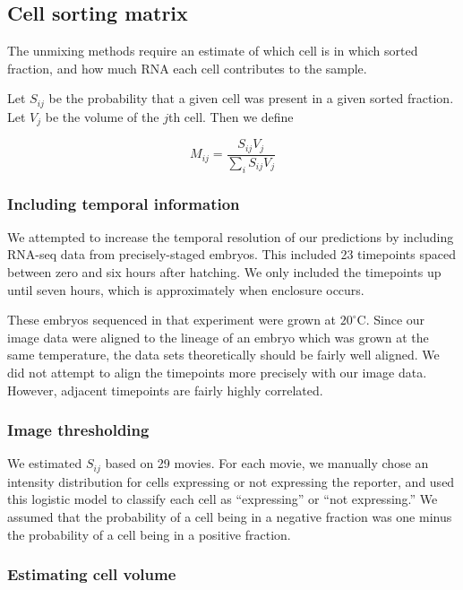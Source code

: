 \documentclass{article}
\begin{document}
\subsection*{Cell sorting matrix}

The unmixing methods require an estimate of which cell is in which sorted fraction,
and how much RNA each cell contributes to the sample.

Let $S_{ij}$ be
the probability that a given cell was present in a given sorted fraction. Let $V_j$
be the volume of the $j$th cell. Then we define

\[
M_{ij} = \frac{S_{ij} V_j}{ \sum\limits_{i}^{} S_{ij} V_j }
\]

\subsubsection*{Including temporal information}

We attempted to increase the temporal resolution of our predictions
by including RNA-seq data from precisely-staged embryos.
This included 23 timepoints spaced between zero and six hours after hatching.
We only included the timepoints up until seven hours, which is approximately
when enclosure occurs.

These embryos sequenced in that experiment were grown at $20^{\circ}$C.
Since our image data were aligned to the lineage of an embryo which was
grown at the same temperature, the data sets theoretically should be fairly
well aligned.
We did not attempt to align the timepoints more precisely with our
image data. However, adjacent timepoints are fairly highly correlated.

\subsubsection*{Image thresholding}

We estimated $S_{ij}$ based on 29 movies.
For each movie, we manually chose an intensity distribution for cells expressing
or not expressing the reporter, and 
used this logistic model to classify each cell as ``expressing'' or ``not expressing.''
We assumed that the probability of a cell being in a negative fraction was
one minus the probability of a cell being in a positive fraction.

\subsubsection*{Estimating cell volume}
\end{document}
